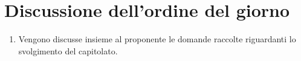 \documentclass[../verbale-2016-12-17.tex]{subfiles}
\begin{document}
	\section{Discussione dell'ordine del giorno}
	\begin{enumerate}
		\item Vengono discusse insieme al proponente le domande raccolte riguardanti lo svolgimento del capitolato.
	\end{enumerate}
\end{document}
